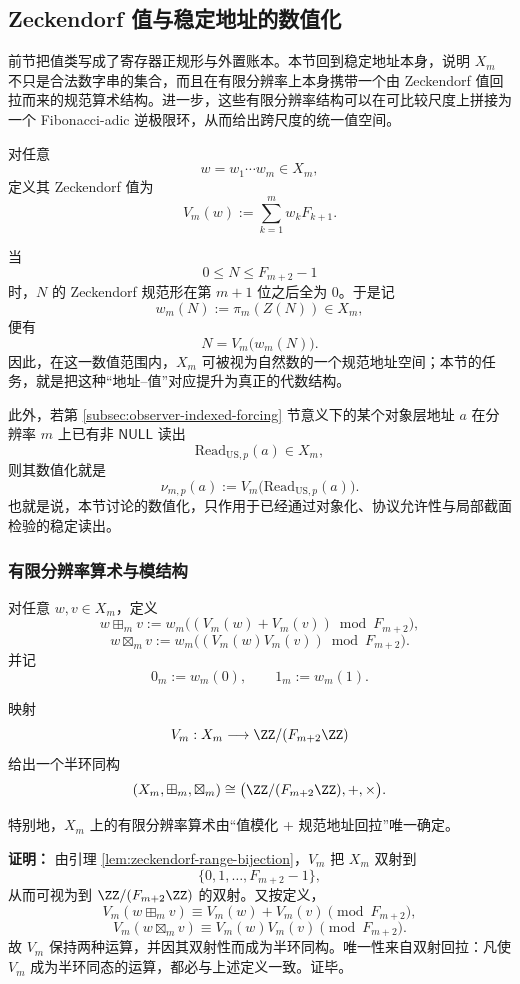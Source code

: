 \subsection{Zeckendorf 值与稳定地址的数值化}\label{subsec:emergent-arithmetic-zeckendorf-value-address}

前节把值类写成了寄存器正规形与外置账本。本节回到稳定地址本身，说明 \(X_m\) 不只是合法数字串的集合，而且在有限分辨率上本身携带一个由 Zeckendorf 值回拉而来的规范算术结构。进一步，这些有限分辨率结构可以在可比较尺度上拼接为一个 Fibonacci-adic 逆极限环，从而给出跨尺度的统一值空间。

对任意
\[
w=w_1\cdots w_m\in X_m,
\]
定义其 Zeckendorf 值为
\[
V_m(w):=\sum_{k=1}^{m} w_k F_{k+1}.
\]

当
\[
0\le N\le F_{m+2}-1
\]
时，\(N\) 的 Zeckendorf 规范形在第 \(m+1\) 位之后全为 \(0\)。于是记
\[
w_m(N):=\pi_m(Z(N))\in X_m,
\]
便有
\[
N=V_m\bigl(w_m(N)\bigr).
\]
因此，在这一数值范围内，\(X_m\) 可被视为自然数的一个规范地址空间；本节的任务，就是把这种“地址--值”对应提升为真正的代数结构。

此外，若第 \ref{subsec:observer-indexed-forcing} 节意义下的某个对象层地址 \(a\) 在分辨率 \(m\) 上已有非 \(\mathsf{NULL}\) 读出
\[
\mathrm{Read}_{\mathrm{US},p}(a)\in X_m,
\]
则其数值化就是
\[
\nu_{m,p}(a):=V_m\bigl(\mathrm{Read}_{\mathrm{US},p}(a)\bigr).
\]
也就是说，本节讨论的数值化，只作用于已经通过对象化、协议允许性与局部截面检验的稳定读出。

\subsubsection{有限分辨率算术与模结构}

\begin{definition}[有限分辨率算术]
对任意 \(w,v\in X_m\)，定义
\[
w\boxplus_m v
:=
w_m\!\bigl((V_m(w)+V_m(v))\bmod F_{m+2}\bigr),
\]
\[
w\boxtimes_m v
:=
w_m\!\bigl((V_m(w)V_m(v))\bmod F_{m+2}\bigr).
\]
并记
\[
0_m:=w_m(0),\qquad 1_m:=w_m(1).
\]
\end{definition}

\begin{theorem}[有限分辨率算术的模结构]\label{thm:finite-resolution-mod}
映射
\[
V_m:X_m\longrightarrow \ZZ/(F_{m+2}\ZZ)
\]
给出一个半环同构
\[
(X_m,\boxplus_m,\boxtimes_m)\cong
\bigl(\ZZ/(F_{m+2}\ZZ),+,\times\bigr).
\]

特别地，\(X_m\) 上的有限分辨率算术由“值模化 + 规范地址回拉”唯一确定。
\end{theorem}

\textbf{证明：}
由引理 \ref{lem:zeckendorf-range-bijection}，\(V_m\) 把 \(X_m\) 双射到
\[
\{0,1,\dots,F_{m+2}-1\},
\]
从而可视为到 \(\ZZ/(F_{m+2}\ZZ)\) 的双射。又按定义，
\[
V_m(w\boxplus_m v)\equiv V_m(w)+V_m(v)\pmod{F_{m+2}},
\]
\[
V_m(w\boxtimes_m v)\equiv V_m(w)V_m(v)\pmod{F_{m+2}}.
\]
故 \(V_m\) 保持两种运算，并因其双射性而成为半环同构。唯一性来自双射回拉：凡使 \(V_m\) 成为半环同态的运算，都必与上述定义一致。证毕。


